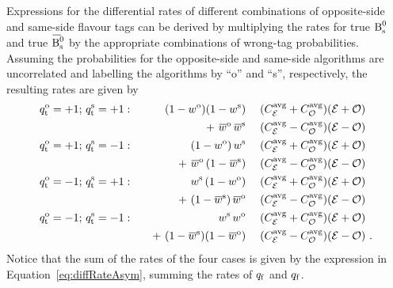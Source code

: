 Expressions for the differential rates of different combinations of opposite-side and same-side flavour tags can be derived by multiplying
the rates for true $\text{B}_\text{s}^\text{0}$ and true $\Bsbar$ by the appropriate combinations of wrong-tag probabilities. Assuming the probabilities for the
opposite-side and same-side algorithms are uncorrelated and labelling the algorithms by ``o'' and ``s'', respectively, the resulting
rates are given by
\begin{alignat}{3}
  \label{eq:diffRateWTag}
  \qtOS=+1;\, \qtSS=+1:  &\quad&  (1-\wTagOS)(1-\wTagSS)           &\;& (\avgCEven+\avgCOdd)(\even+\odd) & \nonumber\\*
                         &     &  +\ \wTagBarOS\, \wTagBarSS       &  & (\avgCEven-\avgCOdd)(\even-\odd) & \nonumber\\
  \qtOS=+1;\, \qtSS=-1:  &     &  (1-\wTagOS)\, \wTagSS            &  & (\avgCEven+\avgCOdd)(\even+\odd) & \nonumber\\*
                         &     &  +\ \wTagBarOS\, (1-\wTagBarSS)   &  & (\avgCEven-\avgCOdd)(\even-\odd) & \nonumber\\
  \qtOS=-1;\, \qtSS=+1:  &     &  \wTagSS\, (1-\wTagOS)            &  & (\avgCEven+\avgCOdd)(\even+\odd) &          \\*
                         &     &  +\ (1-\wTagBarSS)\, \wTagBarOS   &  & (\avgCEven-\avgCOdd)(\even-\odd) & \nonumber\\
  \qtOS=-1;\, \qtSS=-1:  &     &  \wTagSS\, \wTagOS                &  & (\avgCEven+\avgCOdd)(\even+\odd) & \nonumber\\*
                         &     &  +\ (1-\wTagBarSS)(1-\wTagBarOS)  &  & (\avgCEven-\avgCOdd)(\even-\odd) & \nonumber\ .
\end{alignat}
Notice that the sum of the rates of the four cases is given by the expression in Equation~\ref{eq:diffRateAsym}, summing the rates of
${q_\mathrm{f}}$\texteq{} and ${q_\mathrm{f}}$\texteq{}.

